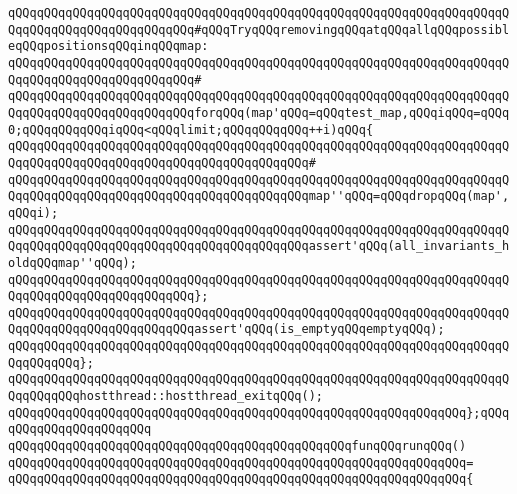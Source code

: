 \newline
\verb|qQQqqQQqqQQqqQQqqQQqqQQqqQQqqQQqqQQqqQQqqQQqqQQqqQQqqQQqqQQqqQQqqQQqqQQqqQQqqQQqqQQqqQQqqQQqqQQq#qQQqTryqQQqremovingqQQqatqQQqallqQQqpossibleqQQqpositionsqQQqinqQQqmap:|\newline
\verb|qQQqqQQqqQQqqQQqqQQqqQQqqQQqqQQqqQQqqQQqqQQqqQQqqQQqqQQqqQQqqQQqqQQqqQQqqQQqqQQqqQQqqQQqqQQqqQQq#|\newline
\verb|qQQqqQQqqQQqqQQqqQQqqQQqqQQqqQQqqQQqqQQqqQQqqQQqqQQqqQQqqQQqqQQqqQQqqQQqqQQqqQQqqQQqqQQqqQQqqQQqforqQQq(map'qQQq=qQQqtest_map,qQQqiqQQq=qQQq0;qQQqqQQqqQQqiqQQq<qQQqlimit;qQQqqQQqqQQq++i)qQQq{|\newline
\verb|qQQqqQQqqQQqqQQqqQQqqQQqqQQqqQQqqQQqqQQqqQQqqQQqqQQqqQQqqQQqqQQqqQQqqQQqqQQqqQQqqQQqqQQqqQQqqQQqqQQqqQQqqQQqqQQq#|\newline
\verb|qQQqqQQqqQQqqQQqqQQqqQQqqQQqqQQqqQQqqQQqqQQqqQQqqQQqqQQqqQQqqQQqqQQqqQQqqQQqqQQqqQQqqQQqqQQqqQQqqQQqqQQqqQQqqQQqmap''qQQq=qQQqdropqQQq(map',qQQqi);|\newline
\newline
\verb|qQQqqQQqqQQqqQQqqQQqqQQqqQQqqQQqqQQqqQQqqQQqqQQqqQQqqQQqqQQqqQQqqQQqqQQqqQQqqQQqqQQqqQQqqQQqqQQqqQQqqQQqqQQqqQQqassert'qQQq(all_invariants_holdqQQqmap''qQQq);|\newline
\verb|qQQqqQQqqQQqqQQqqQQqqQQqqQQqqQQqqQQqqQQqqQQqqQQqqQQqqQQqqQQqqQQqqQQqqQQqqQQqqQQqqQQqqQQqqQQqqQQq};|\newline
\newline
\verb|qQQqqQQqqQQqqQQqqQQqqQQqqQQqqQQqqQQqqQQqqQQqqQQqqQQqqQQqqQQqqQQqqQQqqQQqqQQqqQQqqQQqqQQqqQQqqQQqassert'qQQq(is_emptyqQQqemptyqQQq);|\newline
\verb|qQQqqQQqqQQqqQQqqQQqqQQqqQQqqQQqqQQqqQQqqQQqqQQqqQQqqQQqqQQqqQQqqQQqqQQqqQQqqQQq};|\newline
\newline
\verb|qQQqqQQqqQQqqQQqqQQqqQQqqQQqqQQqqQQqqQQqqQQqqQQqqQQqqQQqqQQqqQQqqQQqqQQqqQQqqQQqhostthread::hostthread_exitqQQq();|\newline
\verb|qQQqqQQqqQQqqQQqqQQqqQQqqQQqqQQqqQQqqQQqqQQqqQQqqQQqqQQqqQQqqQQq};qQQqqQQqqQQqqQQqqQQqqQQq|\newline
\newline
\newline
\verb|qQQqqQQqqQQqqQQqqQQqqQQqqQQqqQQqqQQqqQQqqQQqqQQqfunqQQqrunqQQq()|\newline
\verb|qQQqqQQqqQQqqQQqqQQqqQQqqQQqqQQqqQQqqQQqqQQqqQQqqQQqqQQqqQQqqQQq=|\newline
\verb|qQQqqQQqqQQqqQQqqQQqqQQqqQQqqQQqqQQqqQQqqQQqqQQqqQQqqQQqqQQqqQQq{|\newline
